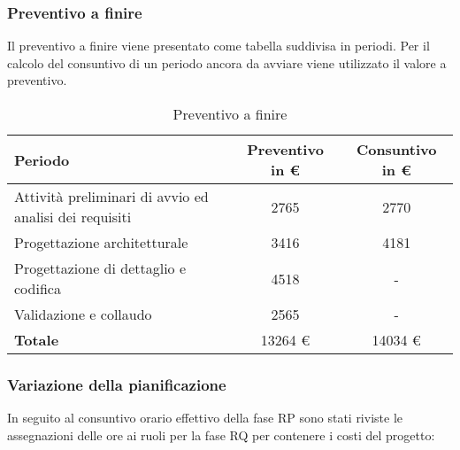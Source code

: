 \subsubsection{Preventivo a finire}
Il preventivo a finire viene presentato come tabella suddivisa in periodi. Per il calcolo del consuntivo di un periodo ancora da avviare viene utilizzato il valore a preventivo.
\begin{table}[h!] %
            \centering
            \renewcommand{\arraystretch}{2} %
            \begin{tabular}{|l|c|c|} %
                \rowcolor{orange!50} %
        		\hline
        		\textbf{Periodo} & \textbf{Preventivo in \euro} & \textbf{Consuntivo in \euro}\\
                \hline
                Attività preliminari di avvio ed analisi dei requisiti & 2765 & 2770\\
                \hline
                Progettazione architetturale & 3416 & 4181\\
                \hline
                Progettazione di dettaglio e codifica & 4518 & -\\
                \hline
                Validazione e collaudo & 2565 & -\\
                \hline
                \textbf{Totale} & 13264 \euro & 14034 \euro\\
                \hline
        \end{tabular}
        \caption{Preventivo a finire} %
        \label{tab:my_label}
\end{table}
\newpage
\subsubsection{Variazione della pianificazione}
In seguito al consuntivo orario effettivo della fase RP sono stati riviste le assegnazioni delle ore ai ruoli per la fase RQ per contenere i costi del progetto:
	

